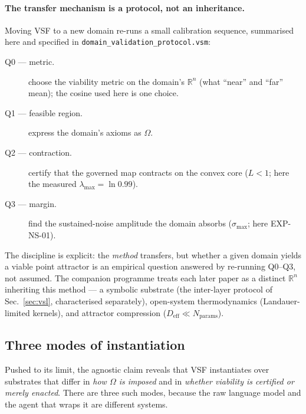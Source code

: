 \documentclass[11pt, a4paper]{article}
\newcommand{\R}{\mathbb{R}}
\begin{document}
\paragraph{The transfer mechanism is a protocol, not an inheritance.} Moving VSF
to a new domain re-runs a small calibration sequence, summarised here and
specified in \texttt{domain\_validation\_protocol.vsm}:
\begin{description}
  \item[Q0 --- metric.] choose the viability metric on the domain's $\R^n$
        (what ``near'' and ``far'' mean); the cosine used here is one choice.
  \item[Q1 --- feasible region.] express the domain's axioms as $\Omega$.
  \item[Q2 --- contraction.] certify that the governed map contracts on the
        convex core ($L < 1$; here the measured $\lambda_\text{max} = \ln 0.99$).
  \item[Q3 --- margin.] find the sustained-noise amplitude the domain absorbs
        ($\sigma_\text{max}$; here EXP-NS-01).
\end{description}
The discipline is explicit: the \emph{method} transfers, but whether a given
domain yields a viable point attractor is an empirical question answered by
re-running Q0--Q3, not assumed. The companion programme treats each later paper
as a distinct $\R^n$ inheriting this method --- a symbolic substrate (the inter-layer
protocol of Sec.~\ref{sec:vsl}, characterised separately), open-system
thermodynamics (Landauer-limited kernels), and attractor compression
($D_\text{eff} \ll N_\text{params}$).

\subsection{Three modes of instantiation}
\label{sec:three_modes}

Pushed to its limit, the agnostic claim reveals that VSF instantiates over
substrates that differ in \emph{how $\Omega$ is imposed} and in \emph{whether
viability is certified or merely enacted}. There are three such modes, because
the raw language model and the agent that wraps it are different systems.
\end{document}
